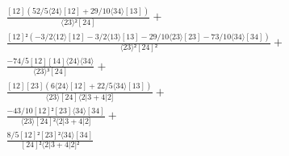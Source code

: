 \documentclass[varwidth, border=5pt]{standalone}
\begin{document}
\begin{my}
$\begin{gathered}
\scriptscriptstyle\frac{[12](52/5⟨24⟩[12]+29/10⟨34⟩[13])}{⟨23⟩²[24]} +\\
\scriptscriptstyle\frac{[12]²(-3/2⟨12⟩[12]-3/2⟨13⟩[13]-29/10⟨23⟩[23]-73/10⟨34⟩[34])}{⟨23⟩²[24]²} +\\
\scriptscriptstyle\frac{-74/5[12][14]⟨24⟩⟨34⟩}{⟨23⟩³[24]} +\\
\scriptscriptstyle\frac{[12][23](6⟨24⟩[12]+22/5⟨34⟩[13])}{⟨23⟩[24]⟨2|3+4|2]} +\\
\scriptscriptstyle\frac{-43/10[12]²[23]⟨34⟩[34]}{⟨23⟩[24]²⟨2|3+4|2]} +\\
\scriptscriptstyle\frac{8/5[12]²[23]²⟨34⟩[34]}{[24]²⟨2|3+4|2]²} \phantom{+}
\end{gathered}$
\end{my}
\end{document}
